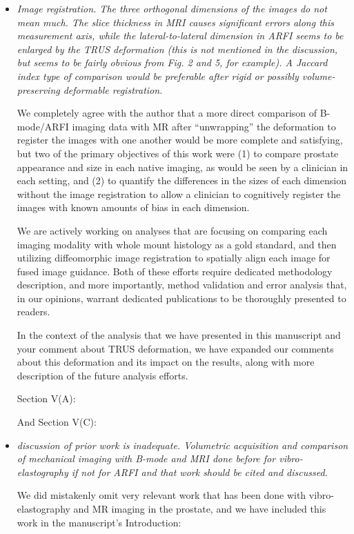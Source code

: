 \documentclass[10pt]{article}
\begin{document}
\begin{itemize}
    \item \textit{Image registration. The three orthogonal dimensions of the
            images do not mean much. The slice thickness in MRI causes
            significant errors along this measurement axis, while the
            lateral-to-lateral dimension in ARFI seems to be enlarged by the
            TRUS deformation (this is not mentioned in the discussion, but
            seems to be fairly obvious from Fig. 2 and 5, for example). A
            Jaccard index type of comparison would be preferable after rigid or
            possibly volume-preserving deformable registration.}

    We completely agree with the author that a more direct comparison of
    B-mode/ARFI imaging data with MR after ``unwrapping'' the deformation to
    register the images with one another would be more complete and satisfying,
    but two of the primary objectives of this work were (1) to compare prostate
    appearance and size in each native imaging, as would be seen by a clinician
    in each setting, and (2) to quantify the differences in the sizes of each
    dimension without the image registration to allow a clinician to
    cognitively register the images with known amounts of bias in each
    dimension.

    We are actively working on analyses that are focusing on comparing each
    imaging modality with whole mount histology as a gold standard, and then
    utilizing diffeomorphic image registration to spatially align each image
    for fused image guidance.  Both of these efforts require dedicated
    methodology description, and more importantly, method validation and
    error analysis that, in our opinions, warrant dedicated publications to be
    thoroughly presented to readers.

    In the context of the analysis that we have presented in this manuscript
    and your comment about TRUS deformation, we have expanded our comments
    about this deformation and its impact on the results, along with more
    description of the future analysis efforts.

    Section V(A):

    

    And Section V(C):

    

    \item \textit{discussion of prior work is inadequate. Volumetric
            acquisition and comparison of mechanical imaging with B-mode and
            MRI done before for vibro-elastography if not for ARFI and that
            work should be cited and discussed.}

    We did mistakenly omit very relevant work that has been done with
    vibro-elastography and MR imaging in the prostate, and we have included
    this work in the manuscript's Introduction:

    \textbf{}

\end{itemize}
\end{document}
